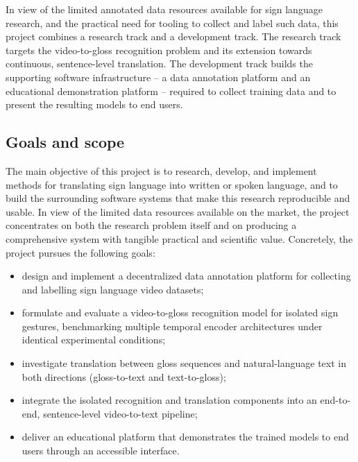 In view of the limited annotated data resources available for sign language
research, and the practical need for tooling to collect and label such data, this
project combines a research track and a development track. The research track
targets the video-to-gloss recognition problem and its extension towards
continuous, sentence-level translation. The development track builds the
supporting software infrastructure -- a data annotation platform and an
educational demonstration platform -- required to collect training data and to
present the resulting models to end users.

\subsection{Goals and scope}
\label{sec:goals-scope}

The main objective of this project is to research, develop, and implement methods
for translating sign language into written or spoken language, and to build the
surrounding software systems that make this research reproducible and usable. In
view of the limited data resources available on the market, the project
concentrates on both the research problem itself and on producing a comprehensive
system with tangible practical and scientific value. Concretely, the project
pursues the following goals:

\begin{itemize}
  \item design and implement a decentralized data annotation platform for
        collecting and labelling sign language video datasets;
  \item formulate and evaluate a video-to-gloss recognition model for isolated
        sign gestures, benchmarking multiple temporal encoder architectures under
        identical experimental conditions;
  \item investigate translation between gloss sequences and natural-language
        text in both directions (gloss-to-text and text-to-gloss);
  \item integrate the isolated recognition and translation components into an
        end-to-end, sentence-level video-to-text pipeline;
  \item deliver an educational platform that demonstrates the trained models to
        end users through an accessible interface.
\end{itemize}


